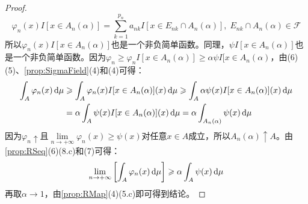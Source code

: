 \begin{proof}
	\begin{equation*}
		\varphi_n(x)I[x\in A_n(\alpha)]=\sum_{k=1}^{p_n}a_{nk}I[x\in E_{nk}\cap A_n(\alpha)],\;E_{nk}\cap A_n(\alpha)\in\mathscr{F}
	\end{equation*}
	所以$\varphi_n(x)I[x\in A_n(\alpha)]$也是一个非负简单函数。同理，$\psi I[x\in A_n(\alpha)]$也是一个非负简单函数。因为$\varphi_n\geqslant\varphi_nI[x\in A_n(\alpha)]\geqslant\alpha\psi I[x\in A_n(\alpha)$，由(6)(5)、\cref{prop:SigmaField}(4)和(4)可得：
	\begin{align*}
		\int_{A}\varphi_n(x)\mathop{}\!\mathrm{d}\mu
		&\geqslant\int_{A}\varphi_n(x)I[x\in A_n(\alpha)](x)\mathop{}\!\mathrm{d}\mu\geqslant\int_{A}\alpha\psi(x)I[x\in A_n(\alpha)](x)\mathop{}\!\mathrm{d}\mu \\
		&=\alpha\int_{A}\psi(x)I[x\in A_n(\alpha)](x)\mathop{}\!\mathrm{d}\mu=\alpha\int_{A_n(\alpha)}\psi(x)\mathop{}\!\mathrm{d}\mu
	\end{align*}
	因为$\varphi_n\uparrow$且$\lim\limits_{n\to+\infty}\varphi_n(x)\geqslant\psi(x)$对任意$x\in A$成立，所以$A_n(\alpha)\uparrow A$。由\cref{prop:RSeq}(6)(8.c)和(7)可得：
	\begin{equation*}
		\lim_{n\to+\infty}\left[\int_{A}\varphi_n(x)\mathop{}\!\mathrm{d}\mu\right]\geqslant\alpha\int_{A}\psi(x)\mathop{}\!\mathrm{d}\mu
	\end{equation*}
	再取$\alpha\to 1$，由\cref{prop:RMap}(4)(5.c)即可得到结论。
\end{proof}


